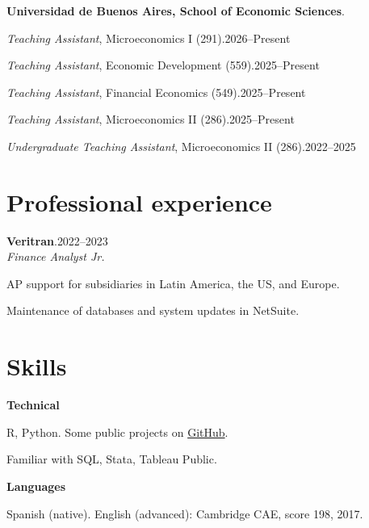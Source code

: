 \documentclass[11pt]{article}
\newcommand{\entrydate}[1]{\hfill{\small{#1}}}
\begin{document}
\textbf{Universidad de Buenos Aires, School of Economic Sciences}.
\begin{cvitems}
  \item \textit{Teaching Assistant}, Microeconomics I (291).\entrydate{2026--Present}
  \item \textit{Teaching Assistant}, Economic Development (559).\entrydate{2025--Present}
  \item \textit{Teaching Assistant}, Financial Economics (549).\entrydate{2025--Present}
  \item \textit{Teaching Assistant}, Microeconomics II (286).\entrydate{2025--Present}
  \item \textit{Undergraduate Teaching Assistant}, Microeconomics II (286).\entrydate{2022--2025}
\end{cvitems}

\section{Professional experience}
\textbf{Veritran}.\entrydate{2022--2023}\\
\textit{Finance Analyst Jr.}
\begin{cvitems}
  \item AP support for subsidiaries in Latin America, the US, and Europe.
  \item Maintenance of databases and system updates in NetSuite.
\end{cvitems}

\section{Skills}
\textbf{Technical}
\begin{cvitems}
  \item R, Python. Some public projects on \href{https://www.github.com/sanarovaz/}{GitHub}.
  \item Familiar with SQL, Stata, Tableau Public.
\end{cvitems}
\textbf{Languages}
\begin{cvitems}
\item Spanish (native). English (advanced): Cambridge CAE, score 198, 2017.
\end{cvitems}
\end{document}
